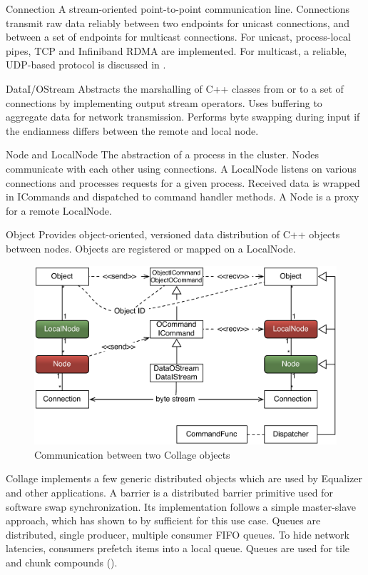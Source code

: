 \begin{compactdesc}
\item[Connection] A stream-oriented point-to-point communication
  line. Connections
  transmit raw data reliably between two endpoints for unicast connections, and
  between a set of endpoints for multicast connections. For unicast,
  process-local pipes, TCP and Infiniband RDMA are implemented. For multicast,
  a reliable, UDP-based protocol is discussed in .
\item[DataI/OStream] Abstracts the marshalling of C++ classes from or to
  a set of connections by implementing output stream operators. Uses buffering
  to aggregate data for network transmission. Performs byte swapping during
  input if the endianness differs between the remote and local node.
\item[Node and LocalNode] The abstraction of a process in the cluster. Nodes
  communicate with each other using connections. A LocalNode listens on various
  connections and processes requests for a given process. Received data is
  wrapped in ICommands and dispatched to command handler methods. A Node is a
  proxy for a remote LocalNode.
\item[Object] Provides object-oriented, versioned data distribution of C++
  objects between nodes. Objects are registered or mapped on a Local\-Node.
\end{compactdesc}

\begin{figure}[ht]\center
  \includegraphics[width=\columnwidth]{images/netObject}
  \caption{\label{fNetObject}Communication between two \textsf{Collage} objects}
\end{figure}

\textsf{Collage} implements a few generic distributed objects which are used by
\textsf{Equalizer} and other applications. A barrier is a distributed barrier
primitive used for software swap synchronization. Its implementation follows a
simple master-slave approach, which has shown to by sufficient for this use
case. Queues are distributed, single producer, multiple consumer FIFO queues. To
hide network latencies, consumers prefetch items into a local queue. Queues are
used for tile and chunk compounds ().

